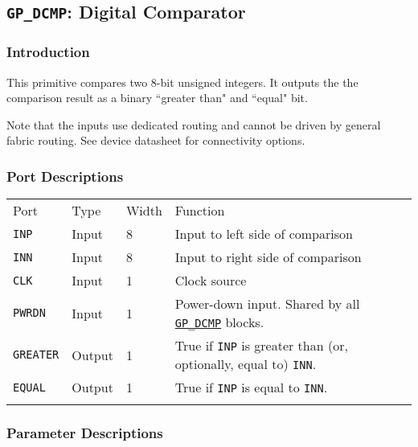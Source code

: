 \documentclass[11pt]{article}
\newcommand{\tokenstyle}[1]{\texttt{#1}}
\newcommand{\whenstyle}[1]{{\fontseries{sb}\selectfont#1}}
\newcommand{\tokenref}[2]{\hyperref[#2]{\tokenstyle{#1}}}
\newcommand{\thinhline}{\Xhline{1\arrayrulewidth}}
\newcommand{\thickhline}{\Xhline{2.5\arrayrulewidth}}
\begin{document}

\pagebreak
\subsection{\tokenstyle{GP\_DCMP}: Digital Comparator}
\label{gp-dcmp}

\subsubsection{Introduction}

This primitive compares two 8-bit unsigned integers. It outputs the the comparison result as a binary ``greater than"
and ``equal" bit.

Note that the inputs use dedicated routing and cannot be driven by general fabric routing. See device datasheet for
connectivity options.

\subsubsection{Port Descriptions}

\begin{tabularx}{\textwidth}{lllX}
\thinhline
\whenstyle{Port} & \whenstyle{Type} & \whenstyle{Width} & \whenstyle{Function} \\
\thickhline
\tokenstyle{INP} & Input & 8 & Input to left side of comparison \\
\thinhline
\tokenstyle{INN} & Input & 8 & Input to right side of comparison \\
\thinhline
\tokenstyle{CLK} & Input & 1 & Clock source \\
\thinhline
\tokenstyle{PWRDN} & Input & 1 & Power-down input. Shared by all \tokenref{GP\_DCMP}{gp-dcmp} blocks. \\
\thinhline
\tokenstyle{GREATER} & Output & 1 & True if \tokenstyle{INP} is greater than (or, optionally, equal to) \tokenstyle{INN}. \\
\thinhline
\tokenstyle{EQUAL} & Output & 1 & True if \tokenstyle{INP} is equal to \tokenstyle{INN}. \\
\thinhline
\end{tabularx}

\subsubsection{Parameter Descriptions}
\end{document}

